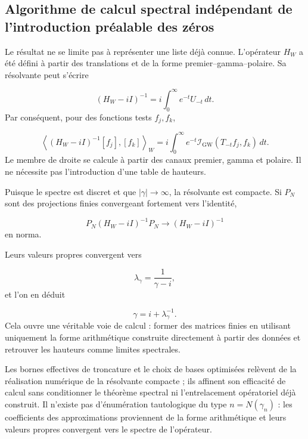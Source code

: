 \subsection{Algorithme de calcul spectral indépendant de l'introduction préalable des zéros}
Le résultat ne se limite pas à représenter une liste déjà connue. L'opérateur \(H_W\) a été défini à partir des translations et de la forme premier–gamma–polaire. Sa résolvante peut s'écrire\par
\[
(H_W-iI)^{-1}
=
i\int_0^\infty
e^{-t}U_{-t}\,dt.
\]
Par conséquent, pour des fonctions tests \(f_j,f_k\),\par
\[
\left\langle
(H_W-iI)^{-1}[f_j],[f_k]
\right\rangle_W
=
i\int_0^\infty
e^{-t}
\mathscr I_{\mathrm{GW}}(T_{-t}f_j,f_k)\,dt.
\]
Le membre de droite se calcule à partir des canaux premier, gamma et polaire. Il ne nécessite pas l'introduction d'une table de hauteurs.\par
Puisque le spectre est discret et que \(|\gamma|\to\infty\), la résolvante est compacte. Si \(P_N\) sont des projections finies convergeant fortement vers l'identité,\par
\[
P_N(H_W-iI)^{-1}P_N
\longrightarrow
(H_W-iI)^{-1}
\]
en norma.\par
Leurs valeurs propres convergent vers\par
\[
\lambda_\gamma
=
\frac1{\gamma-i},
\]
et l'on en déduit\par
\[
\gamma=i+\lambda_\gamma^{-1}.
\]
Cela ouvre une véritable voie de calcul : former des matrices finies en utilisant uniquement la forme arithmétique construite directement à partir des données et retrouver les hauteurs comme limites spectrales.\par
Les bornes effectives de troncature et le choix de bases optimisées relèvent de la réalisation numérique de la résolvante compacte ; ils affinent son efficacité de calcul sans conditionner le théorème spectral ni l'entrelacement opératoriel déjà construit. Il n'existe pas d'énumération tautologique du type \(n=N(\gamma_n)\) : les coefficients des approximations proviennent de la forme arithmétique et leurs valeurs propres convergent vers le spectre de l'opérateur.\par
{}
